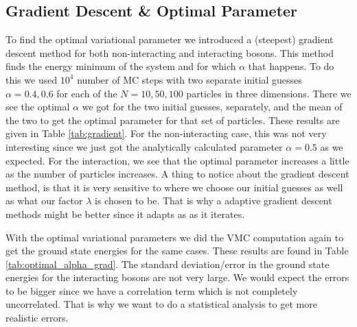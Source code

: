 \documentclass[12pt,a4paper,english]{article}
\begin{document}
\subsection{Gradient Descent \& Optimal Parameter}
\label{subsect:Result_gradient}
To find the optimal variational parameter we introduced a (steepest) gradient descent method for both non-interacting and interacting bosons. This method finds the energy minimum of the system and for which $\alpha$ that happens. To do this we used $10^4$ number of MC steps with two separate initial guesses $\alpha=0.4, 0.6$ for each of the $N=10,50,100$ particles in three dimensions. There we see the optimal $\alpha$ we got for the two initial guesses, separately, and the mean of the two to get the optimal parameter for that set of particles. These results are given in Table \ref{tab:gradient}. For the non-interacting case, this was not very interesting since we just got the analytically calculated parameter $\alpha=0.5$ as we expected. For the interaction, we see that the optimal parameter increases a little as the number of particles increases. A thing to notice about the gradient descent method, is that it is very sensitive to where we choose our initial guesses as well as what our factor $\lambda$ is chosen to be. That is why a adaptive gradient descent methods might be better since it adapts as as it iterates.

With the optimal variational parameters we did the VMC computation again to get the ground state energies for the same cases. These results are found in Table \ref{tab:optimal_alpha_grad}. The standard deviation/error in the ground state energies for the interacting bosons are not very large. We would expect the errors to be bigger since we have a correlation term which is not completely uncorrelated. That is why we want to do a statistical analysis to get more realistic errors.
\end{document}
